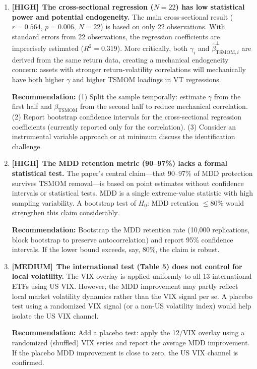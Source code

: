 \documentclass[12pt,a4paper]{article}
\newcommand{\HIGH}{\textcolor{highsev}{\textbf{[HIGH]}}}
\newcommand{\MEDIUM}{\textcolor{medsev}{\textbf{[MEDIUM]}}}
\begin{document}
\begin{enumerate}[label=\textbf{7.\arabic*}]

\item \HIGH\ \textbf{The cross-sectional regression ($N = 22$) has low statistical power and potential endogeneity.}
The main cross-sectional result ($r = 0.564$, $p = 0.006$, $N = 22$) is based on only 22 observations. With standard errors from 22 observations, the regression coefficients are imprecisely estimated ($R^2 = 0.319$). More critically, both $\gamma_i$ and $\hat{\beta}_{\text{TSMOM},i}^{\perp}$ are derived from the same return data, creating a mechanical endogeneity concern: assets with stronger return-volatility correlations will mechanically have both higher $\gamma$ and higher TSMOM loadings in VT regressions.

\textbf{Recommendation:} (1) Split the sample temporally: estimate $\gamma$ from the first half and $\beta_{\text{TSMOM}}$ from the second half to reduce mechanical correlation. (2) Report bootstrap confidence intervals for the cross-sectional regression coefficients (currently reported only for the correlation). (3) Consider an instrumental variable approach or at minimum discuss the identification challenge.

\item \HIGH\ \textbf{The MDD retention metric (90--97\%) lacks a formal statistical test.}
The paper's central claim---that 90--97\% of MDD protection survives TSMOM removal---is based on point estimates without confidence intervals or statistical tests. MDD is a single extreme-value statistic with high sampling variability. A bootstrap test of $H_0$: MDD retention $\leq 80\%$ would strengthen this claim considerably.

\textbf{Recommendation:} Bootstrap the MDD retention rate (10,000 replications, block bootstrap to preserve autocorrelation) and report 95\% confidence intervals. If the lower bound exceeds, say, 80\%, the claim is robust.

\item \MEDIUM\ \textbf{The international test (Table 5) does not control for local volatility.}
The VIX overlay is applied uniformly to all 13 international ETFs using US VIX. However, the MDD improvement may partly reflect local market volatility dynamics rather than the VIX signal per se. A placebo test using a randomized VIX signal (or a non-US volatility index) would help isolate the US VIX channel.

\textbf{Recommendation:} Add a placebo test: apply the 12/VIX overlay using a randomized (shuffled) VIX series and report the average MDD improvement. If the placebo MDD improvement is close to zero, the US VIX channel is confirmed.


\end{enumerate}
\end{document}
